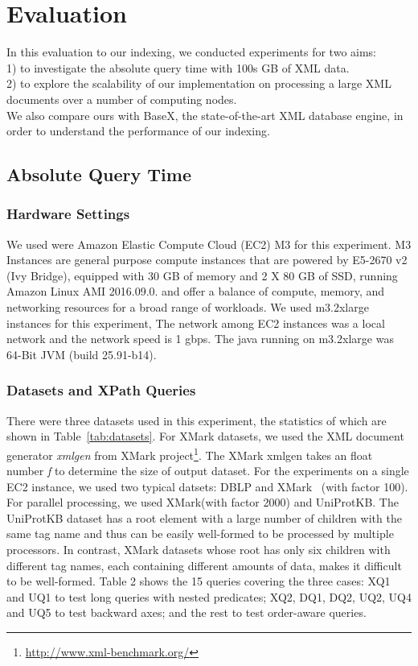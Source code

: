 \section{Evaluation}
\label{sec:evaluation}

In this evaluation to our indexing, we conducted experiments for two aims: \\
1) to investigate the absolute query time with 100s GB of XML data.\\
2) to explore the scalability of our implementation on processing 
a large XML documents over a number of computing nodes.\\
We also compare ours with BaseX, the state-of-the-art XML database engine, in 
order to understand the performance of our indexing.

\subsection{Absolute Query Time} 

\subsubsection{Hardware Settings}

We used were Amazon Elastic Compute Cloud (EC2) M3 for this experiment. M3
Instances are general purpose compute instances that are powered by E5-2670 v2
(Ivy Bridge), equipped with 30 GB of memory and 2 X 80 GB of SSD, running Amazon
Linux AMI 2016.09.0. and offer a balance of compute, memory, and networking
resources for a broad range of workloads. We used m3.2xlarge instances for this
experiment, The network among EC2 instances was a local network and the network
speed is 1 gbps. The java running on m3.2xlarge was 64-Bit JVM (build
25.91-b14).


\subsubsection{Datasets and XPath Queries}

There were three datasets used in this experiment, the statistics of which are
shown in Table~\ref{tab:datasets}. For XMark datasets, we used the XML document
generator \emph{xmlgen} from XMark
project\footnote{\url{http://www.xml-benchmark.org/}}. The XMark xmlgen takes an
float number \emph{f} to determine the size of output dataset. 
For the experiments on a single EC2 instance,  we used two typical datsets: DBLP
and XMark~\cite{XMark} (with factor 100). For parallel processing, we used
XMark(with factor 2000) and UniProtKB. The UniProtKB dataset has a root element
with a large number of children with the same tag name and thus can be easily
well-formed  to be processed by multiple processors.  In contrast, XMark
datasets whose root has only six children  with different tag names, each
containing different amounts of data, makes it difficult to be well-formed.
Table 2 shows the 15 queries covering the three cases: XQ1 and UQ1 to test long
queries with nested predicates;  XQ2, DQ1, DQ2, UQ2, UQ4 and UQ5 to test
backward axes;  and the rest to test order-aware queries.

